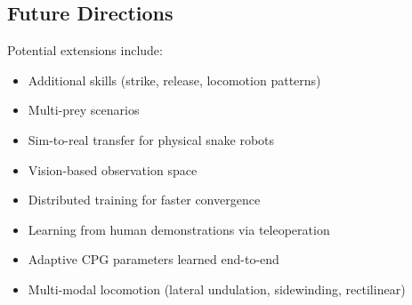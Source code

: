 \documentclass[11pt]{article}
\begin{document}
\subsection{Future Directions}

Potential extensions include:
\begin{itemize}
    \item Additional skills (strike, release, locomotion patterns)
    \item Multi-prey scenarios
    \item Sim-to-real transfer for physical snake robots
    \item Vision-based observation space
    \item Distributed training for faster convergence
    \item Learning from human demonstrations via teleoperation
    \item Adaptive CPG parameters learned end-to-end
    \item Multi-modal locomotion (lateral undulation, sidewinding, rectilinear)
\end{itemize}
\end{document}
